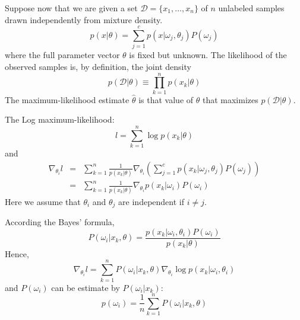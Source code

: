 \documentclass[slidestop,compress,mathserif]{beamer}
\begin{document}
	\begin{frame}
		Suppose now that we are given a set $\mathcal{D}=\{x_1,\ldots,x_n\}$ of $n$ unlabeled samples drawn independently from mixture density.
		$$p(x|\theta) = \sum_{j=1}^cp(x|\omega_j,\theta_j)P(\omega_j)$$
		where the full parameter vector $\theta$ is fixed but unknown. The likelihood of the observed samples is, by definition, the joint density
		$$p(\mathcal{D}|\theta)\equiv\prod_{k=1}^np(x_k|\theta)$$
		The maximum-likelihood estimate $\hat{\theta}$ is that value of $\theta$ that maximizes $p(\mathcal{D}|\theta)$.
	\end{frame}
	\begin{frame}
		The Log maximum-likelihood:
		$$l=\sum_{k=1}^n\log p(x_k|\theta)$$
		and
		\begin{eqnarray*}
			\nabla_{\theta_i}l &=& \sum_{k=1}^n\frac{1}{p(x_k|\theta)}\nabla_{\theta_i}\left(\sum_{j=1}^cp(x_k|\omega_j,\theta_j)P(\omega_j)\right)\\
			&=& \sum_{k=1}^n\frac{1}{p(x_k|\theta)}\nabla_{\theta_i}p(x_k|\omega_i)P(\omega_i)
		\end{eqnarray*}
		Here we assume that $\theta_i$  and $\theta_j$ are independent if $i\neq j$.
	\end{frame}
	\begin{frame}
		According the Bayes' formula,
		$$P(\omega_i|x_k,\theta)=\frac{p(x_k|\omega_i,\theta_i)P(\omega_i)}{p(x_k|\theta)}$$
		Hence,
		$$\nabla_{\theta_i}l=\sum_{k=1}^nP(\omega_i|x_k,\theta)\nabla_{\theta_i}\log p(x_k|\omega_i,\theta_i)$$
		and $P(\omega_i)$ can be estimate by $P(\omega_i|x_k)$:
		$$p(\omega_i)=\frac{1}{n}\sum_{k=1}^nP(\omega_i|x_k,\theta)$$ 
	\end{frame}
\end{document}
